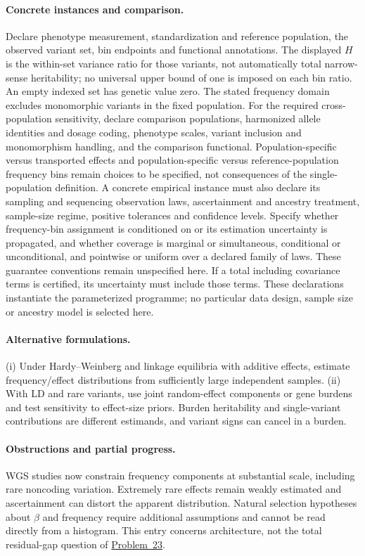 \documentclass[11pt]{article}
\begin{document}
\paragraph{Concrete instances and comparison.} Declare phenotype measurement, standardization and reference population, the observed variant set, bin endpoints and functional annotations. The displayed $H$ is the within-set variance ratio for those variants, not automatically total narrow-sense heritability; no universal upper bound of one is imposed on each bin ratio. An empty indexed set has genetic value zero. The stated frequency domain excludes monomorphic variants in the fixed population. For the required cross-population sensitivity, declare comparison populations, harmonized allele identities and dosage coding, phenotype scales, variant inclusion and monomorphism handling, and the comparison functional. Population-specific versus transported effects and population-specific versus reference-population frequency bins remain choices to be specified, not consequences of the single-population definition. A concrete empirical instance must also declare its sampling and sequencing observation laws, ascertainment and ancestry treatment, sample-size regime, positive tolerances and confidence levels. Specify whether frequency-bin assignment is conditioned on or its estimation uncertainty is propagated, and whether coverage is marginal or simultaneous, conditional or unconditional, and pointwise or uniform over a declared family of laws. These guarantee conventions remain unspecified here. If a total including covariance terms is certified, its uncertainty must include those terms. These declarations instantiate the parameterized programme; no particular data design, sample size or ancestry model is selected here.

\paragraph{Alternative formulations.} (i) Under Hardy--Weinberg and linkage equilibria with additive effects, estimate frequency/effect distributions from sufficiently large independent samples. (ii) With LD and rare variants, use joint random-effect components or gene burdens and test sensitivity to effect-size priors. Burden heritability and single-variant contributions are different estimands, and variant signs can cancel in a burden.
\paragraph{Obstructions and partial progress.} WGS studies now constrain frequency components at substantial scale, including rare noncoding variation. Extremely rare effects remain weakly estimated and ascertainment can distort the apparent distribution. Natural selection hypotheses about $\beta$ and frequency require additional assumptions and cannot be read directly from a histogram. This entry concerns architecture, not the total residual-gap question of \href{https://we-solve.github.io/problems/trait-specific-unexplained-heritability-e80d2558/}{Problem~23}.
\end{document}
